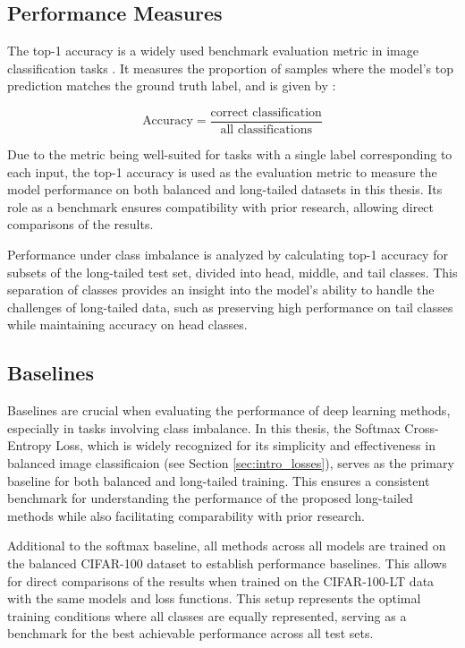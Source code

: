 \subsection{Performance Measures}
The top-1 accuracy is a widely used benchmark evaluation metric in image classification tasks \cite{zhang2023deep}. It measures the proportion of samples where the model's top prediction matches the ground truth label, and is given by \cite{metrics}:

\begin{equation}
    \text{Accuracy} = \frac{\text{correct classification}}{\text{all classifications}}
\end{equation}


\noindent Due to the metric being well-suited for tasks with a single label corresponding to each input, the top-1 accuracy is used as the evaluation metric to measure the model performance on both balanced and long-tailed datasets in this thesis. Its role as a benchmark ensures compatibility with prior research, allowing direct comparisons of the results.

Performance under class imbalance is analyzed by calculating top-1 accuracy for subsets of the long-tailed test set, divided into head, middle, and tail classes. This separation of classes provides an insight into the model's ability to handle the challenges of long-tailed data, such as preserving high performance on tail classes while maintaining accuracy on head classes.


\subsection{Baselines}
Baselines are crucial when evaluating the performance of deep learning methods, especially in tasks involving class imbalance. In this thesis, the Softmax Cross-Entropy Loss, which is widely recognized for its simplicity and effectiveness in balanced image classificaion (see Section \ref{sec:intro_losses}), serves as the primary baseline for both balanced and long-tailed training. This ensures a consistent benchmark for understanding the performance of the proposed long-tailed methods while also facilitating comparability with prior research.

Additional to the softmax baseline, all methods across all models are trained on the balanced CIFAR-100 dataset to establish performance baselines. This allows for direct comparisons of the results when trained on the CIFAR-100-LT data with the same models and loss functions. This setup represents the optimal training conditions where all classes are equally represented, serving as a benchmark for the best achievable performance across all test sets.


